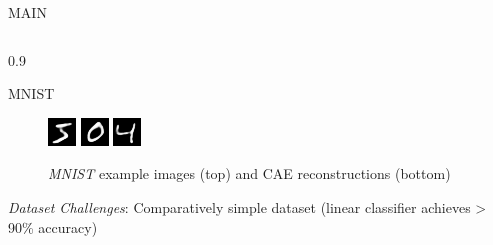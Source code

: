 \documentclass[final]{beamer}
\newlength{\onecolwid}
\newlength{\threecolwid}
\begin{document}
\begin{frame}[t]
\begin{columns}[t]
\begin{column}{\threecolwid}
\begin{alertblock}{MAIN}
\begin{columns}[t, totalwidth=0.9\threecolwid]
\begin{column}{0.9\onecolwid}
\begin{block}{MNIST}
\begin{figure}
\includegraphics[width=0.2\linewidth]{graphics/reconstructions/mnist/reconstruction_00.png}
\includegraphics[width=0.2\linewidth]{graphics/reconstructions/mnist/reconstruction_01.png}
\includegraphics[width=0.2\linewidth]{graphics/reconstructions/mnist/reconstruction_02.png}

\caption{\emph{MNIST} example images (top) and CAE reconstructions (bottom)}

\end{figure}

\emph{Dataset Challenges}: Comparatively simple dataset (linear classifier achieves > 90\% accuracy)

\end{block}
\end{column}


\end{columns}
\end{alertblock}
\end{column}
\end{columns}
\end{frame}
\end{document}
